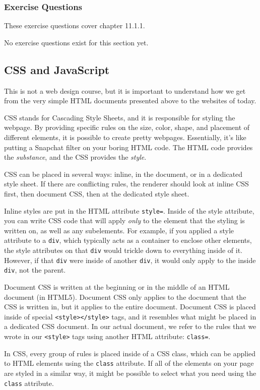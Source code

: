 \subsubsection*{Exercise Questions}
These exercise questions cover chapter 11.1.1.

No exercise questions exist for this section yet.

\subsection{CSS and JavaScript}
This is not a web design course, but it is important to understand how we get from the very simple HTML documents presented above to the websites of today.\par
CSS stands for Cascading Style Sheets, and it is responsible for styling the webpage. By providing specific rules on the size, color, shape, and placement of different elements, it is possible to create pretty webpages. Essentially, it's like putting a Snapchat filter on your boring HTML code. The HTML code provides the \textit{substance}, and the CSS provides the \textit{style}.\par
CSS can be placed in several ways: inline, in the document, or in a dedicated style sheet. If there are conflicting rules, the renderer should look at inline CSS first, then document CSS, then at the dedicated style sheet.\par
Inline styles are put in the HTML attribute \verb|style=|. Inside of the style attribute, you can write CSS code that will apply \textit{only} to the element that the styling is written on, as well as any subelements. For example, if you applied a style attribute to a \verb|div|, which typically acts as a container to enclose other elements, the style attributes on that \verb|div| would trickle down to everything inside of it. However, if that \verb|div| were inside of another \verb|div|, it would only apply to the inside \verb|div|, not the parent.\par
{}
Document CSS is written at the beginning or in the middle of an HTML document (in HTML5). Document CSS only applies to the document that the CSS is written in, but it applies to the entire document. Document CSS is placed inside of special \verb|<style></style>| tags, and it resembles what might be placed in a dedicated CSS document. In our actual document, we refer to the rules that we wrote in our \verb|<style>| tags using another HTML attribute: \verb|class=|.\par
{}
In CSS, every group of rules is placed inside of a CSS class, which can be applied to HTML elements using the \verb|class| attribute. If all of the elements on your page are styled in a similar way, it might be possible to select what you need using the \verb|class| attribute.

